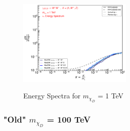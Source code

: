 \documentclass[epj,nopacs,fleqn]{svjour}
\begin{document}
\begin{figure}[!b]
\subfigure
{\includegraphics[width=0.49\textwidth]{Fig/1TeV/1_neutrinos_tau_PPPC_Comparison_xdxd_fotone_1.pdf}}
\caption{Energy Spectra for $m_{\chi_D}$ = 1 TeV}
\end{figure}
%
%
%
\clearpage
\subsubsection{"Old" $m_{\chi_D}$ = 100 TeV}
\end{document}
